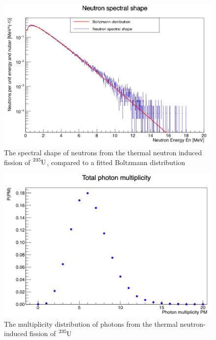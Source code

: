 \documentclass[]{article}
\begin{document}
\begin{figure} [H]
	\centering
	\includegraphics[scale=0.36]{U235_n_spectral_shape.png}
	\caption{The spectral shape of neutrons from the thermal neutron induced fission of $\ce{^{235}U}$, compared to a fitted Boltzmann distribution}
	\label{fig:U235_n_spectral_shape}
\end{figure}

\begin{figure} [H]
	\centering
	\includegraphics[scale=0.36]{U235_ph_mult.png}
	\caption{The multiplicity distribution of photons from the thermal neutron-induced fission of $\ce{^{235}U}$}
	\label{fig:U235_ph_mult}
\end{figure}
\end{document}
